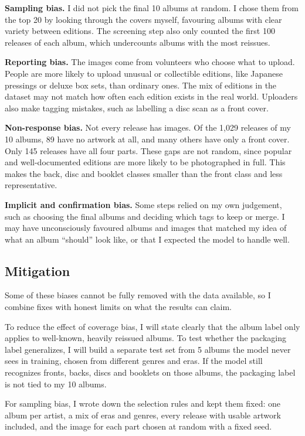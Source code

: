 \documentclass[11pt,a4paper]{article}
\begin{document}
\textbf{Sampling bias.} I did not pick the final 10 albums at random. I chose them from the top 20 by looking through the covers myself, favouring albums with clear variety between editions. The screening step also only counted the first 100 releases of each album, which undercounts albums with the most reissues.

\textbf{Reporting bias.} The images come from volunteers who choose what to upload. People are more likely to upload unusual or collectible editions, like Japanese pressings or deluxe box sets, than ordinary ones. The mix of editions in the dataset may not match how often each edition exists in the real world. Uploaders also make tagging mistakes, such as labelling a disc scan as a front cover.

\textbf{Non-response bias.} Not every release has images. Of the 1,029 releases of my 10 albums, 89 have no artwork at all, and many others have only a front cover. Only 145 releases have all four parts. These gaps are not random, since popular and well-documented editions are more likely to be photographed in full. This makes the back, disc and booklet classes smaller than the front class and less representative.

\textbf{Implicit and confirmation bias.} Some steps relied on my own judgement, such as choosing the final albums and deciding which tags to keep or merge. I may have unconsciously favoured albums and images that matched my idea of what an album ``should'' look like, or that I expected the model to handle well.

\subsection{Mitigation}
Some of these biases cannot be fully removed with the data available, so I combine fixes with honest limits on what the results can claim.

To reduce the effect of coverage bias, I will state clearly that the album label only applies to well-known, heavily reissued albums. To test whether the packaging label generalizes, I will build a separate test set from 5 albums the model never sees in training, chosen from different genres and eras. If the model still recognizes fronts, backs, discs and booklets on those albums, the packaging label is not tied to my 10 albums.

For sampling bias, I wrote down the selection rules and kept them fixed: one album per artist, a mix of eras and genres, every release with usable artwork included, and the image for each part chosen at random with a fixed seed.
\end{document}
